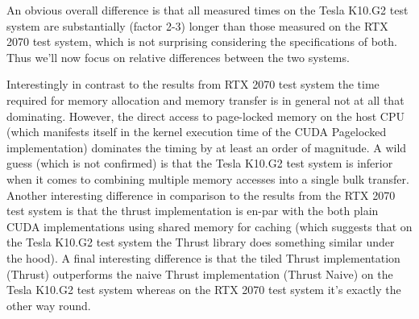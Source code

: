 An obvious overall difference is that all measured times on the 
Tesla K10.G2 test system are substantially (factor 2-3) longer than those measured on the RTX 2070 test system, which is not surprising considering the specifications of both. Thus we'll now focus on relative differences between the two systems.

Interestingly in contrast to the results from RTX 2070 test system the time required for memory allocation and memory transfer is in general not at all that dominating. However, the direct access to page-locked memory on the host CPU (which manifests itself in the kernel execution time of the CUDA Pagelocked implementation) dominates the timing by at least an order of magnitude. A wild guess (which is not confirmed) is that the Tesla K10.G2 test system is inferior when it comes to combining multiple memory accesses into a single bulk transfer.
Another interesting difference in comparison to the results from the RTX 2070 test system is that the thrust implementation is en-par with the both plain CUDA implementations using shared memory for caching (which suggests that on the Tesla K10.G2 test system the Thrust library does something similar under the hood). A final interesting difference is that the tiled Thrust implementation (Thrust) outperforms the naive Thrust implementation (Thrust Naive) on the Tesla K10.G2 test system whereas on the RTX 2070 test system it's exactly the other way round.


